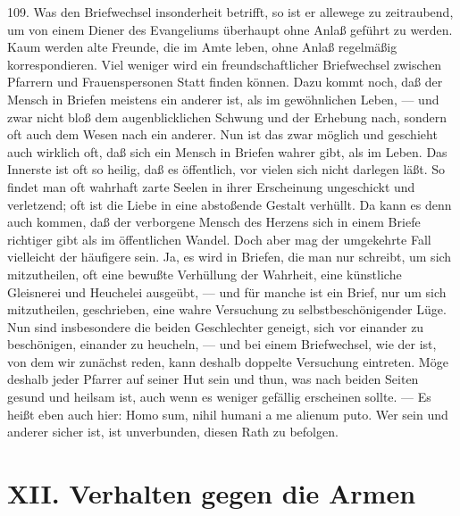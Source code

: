 109. Was den Briefwechsel insonderheit betrifft, so ist er allewege zu zeitraubend, um von einem Diener des Evangeliums überhaupt ohne Anlaß geführt zu werden. Kaum werden alte Freunde, die im Amte leben, ohne Anlaß regelmäßig korrespondieren. Viel weniger wird ein freundschaftlicher Briefwechsel zwischen Pfarrern und Frauenspersonen Statt finden können. Dazu kommt noch, daß der Mensch in Briefen meistens ein anderer ist, als im gewöhnlichen Leben, — und zwar nicht bloß dem augenblicklichen Schwung und der Erhebung nach, sondern oft auch dem Wesen nach ein anderer. Nun ist das zwar möglich und geschieht auch wirklich oft, daß sich ein Mensch in Briefen wahrer gibt, als im Leben. Das Innerste ist oft so heilig, daß es öffentlich, vor vielen sich nicht darlegen läßt. So findet man oft wahrhaft zarte Seelen in ihrer Erscheinung ungeschickt und verletzend; oft ist die Liebe in eine abstoßende Gestalt verhüllt. Da kann es denn auch kommen, daß der verborgene Mensch des Herzens sich in einem Briefe richtiger gibt als im öffentlichen Wandel. Doch aber mag der umgekehrte Fall vielleicht der häufigere sein. Ja, es wird in Briefen, die man nur schreibt, um sich mitzutheilen, oft eine bewußte Verhüllung der Wahrheit,
eine künstliche Gleisnerei und Heuchelei ausgeübt, — und für manche ist ein Brief, nur um sich mitzutheilen, geschrieben, eine wahre Versuchung zu selbstbeschönigender Lüge. Nun sind insbesondere die beiden Geschlechter geneigt, sich vor einander zu beschönigen, einander zu heucheln, — und bei einem Briefwechsel, wie der ist, von dem wir zunächst reden, kann deshalb doppelte Versuchung eintreten. Möge deshalb jeder Pfarrer auf seiner Hut sein und thun, was nach beiden Seiten gesund und heilsam ist, auch wenn es weniger gefällig erscheinen sollte. — Es heißt eben auch hier: Homo sum, nihil humani a me alienum puto. Wer sein und anderer sicher ist, ist unverbunden, diesen Rath zu befolgen.

\section{XII. Verhalten gegen die Armen}

